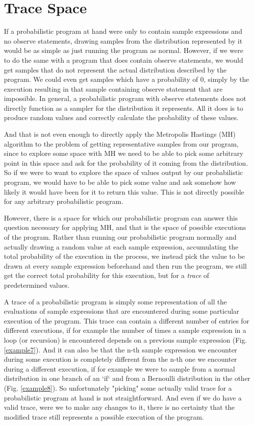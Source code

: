 \section{Trace Space}

If a probabilistic program at hand were only to contain sample expressions and no observe statements, drawing samples from the distribution represented by it would be as simple as just running the program as normal. However, if we were to do the same with a program that does contain observe statements, we would get samples that do not represent the actual distribution described by the program. We could even get samples which have a probability of $0$, simply by the execution resulting in that sample containing observe statement that are impossible. In general, a probabilistic program with observe statements does not directly function as a sampler for the distribution it represents. All it does is to produce random values and correctly calculate the probability of these values.

And that is not even enough to directly apply the Metropolis Hastings (MH) algorithm to the problem of getting representative samples from our program, since to explore some space with MH we need to be able to pick some arbitrary point in this space and ask for the probability of it coming from the distribution. So if we were to want to explore the space of values output by our probabilistic program, we would have to be able to pick some value and ask somehow how likely it would have been for it to return this value. This is not directly possible for any arbitrary probabilistic program.

However, there is a space for which our probabilistic program can answer this question necessary for applying MH, and that is the space of possible executions of the program. Rather than running our probabilistic program normally and actually drawing a random value at each sample expression, accumulating the total probability of the execution in the process, we instead pick the value to be drawn at every sample expression beforehand and then run the program, we still get the correct total probability for this execution, but for a \textit{trace} of predetermined values.

A trace of a probabilistic program is simply some representation of all the evaluations of sample expressions that are encountered during some particular execution of the program. This trace can contain a different number of entries for different executions, if for example the number of times a sample expression in a loop (or recursion) is encountered depends on a previous sample expression (Fig. \ref{example7}). And it can also be that the n-th sample expression we encounter during some execution is completely different from the n-th one we encounter during a different execution, if for example we were to sample from a normal distribution in one branch of an `if` and from a Bernoulli distribution in the other (Fig. \ref{example8}). So unfortunately "picking" some actually valid trace for a probabilistic program at hand is not straightforward. And even if we do have a valid trace, were we to make any changes to it, there is no certainty that the modified trace still represents a possible execution of the program.

